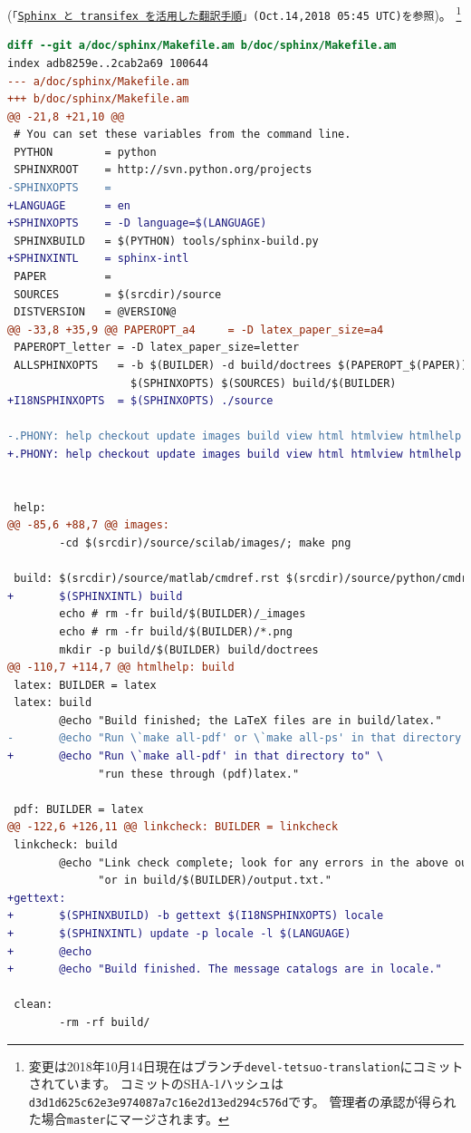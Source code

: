 \documentclass{../../style/ltjoc}
\begin{document}
(\texttt{「\href{http://www.turbare.net/weblog/workflow-with-transifex-and-sphinx.html}{Sphinx と transifex を活用した翻訳手順}」(Oct.14,2018 05:45 UTC)を参照})。
\footnote{
変更は2018年10月14日現在はブランチ\texttt{devel-tetsuo-translation}にコミットされています。
コミットのSHA-1ハッシュは\texttt{d3d1d625c62e3e974087a7c16e2d13ed294c576d}です。
管理者の承認が得られた場合\texttt{master}にマージされます。
}
\begin{lstlisting}[language=diff]
diff --git a/doc/sphinx/Makefile.am b/doc/sphinx/Makefile.am
index adb8259e..2cab2a69 100644
--- a/doc/sphinx/Makefile.am
+++ b/doc/sphinx/Makefile.am
@@ -21,8 +21,10 @@
 # You can set these variables from the command line.
 PYTHON        = python
 SPHINXROOT    = http://svn.python.org/projects
-SPHINXOPTS    =
+LANGUAGE      = en
+SPHINXOPTS    = -D language=$(LANGUAGE)
 SPHINXBUILD   = $(PYTHON) tools/sphinx-build.py
+SPHINXINTL    = sphinx-intl
 PAPER         =
 SOURCES       = $(srcdir)/source
 DISTVERSION   = @VERSION@
@@ -33,8 +35,9 @@ PAPEROPT_a4     = -D latex_paper_size=a4
 PAPEROPT_letter = -D latex_paper_size=letter
 ALLSPHINXOPTS   = -b $(BUILDER) -d build/doctrees $(PAPEROPT_$(PAPER)) \
                   $(SPHINXOPTS) $(SOURCES) build/$(BUILDER)
+I18NSPHINXOPTS  = $(SPHINXOPTS) ./source

-.PHONY: help checkout update images build view html htmlview htmlhelp latex pdf linkcheck clean upload
+.PHONY: help checkout update images build view html htmlview htmlhelp latex pdf linkcheck clean upload gettext


 help:
@@ -85,6 +88,7 @@ images:
        -cd $(srcdir)/source/scilab/images/; make png

 build: $(srcdir)/source/matlab/cmdref.rst $(srcdir)/source/python/cmdref.rst $(srcdir)/source/scilab/cmdref.rst checkout images
+       $(SPHINXINTL) build
        echo # rm -fr build/$(BUILDER)/_images
        echo # rm -fr build/$(BUILDER)/*.png
        mkdir -p build/$(BUILDER) build/doctrees
@@ -110,7 +114,7 @@ htmlhelp: build
 latex: BUILDER = latex
 latex: build
        @echo "Build finished; the LaTeX files are in build/latex."
-       @echo "Run \`make all-pdf' or \`make all-ps' in that directory to" \
+       @echo "Run \`make all-pdf' in that directory to" \
              "run these through (pdf)latex."

 pdf: BUILDER = latex
@@ -122,6 +126,11 @@ linkcheck: BUILDER = linkcheck
 linkcheck: build
        @echo "Link check complete; look for any errors in the above output " \
              "or in build/$(BUILDER)/output.txt."
+gettext:
+       $(SPHINXBUILD) -b gettext $(I18NSPHINXOPTS) locale
+       $(SPHINXINTL) update -p locale -l $(LANGUAGE)
+       @echo
+       @echo "Build finished. The message catalogs are in locale."

 clean:
        -rm -rf build/
\end{lstlisting}
\end{document}
